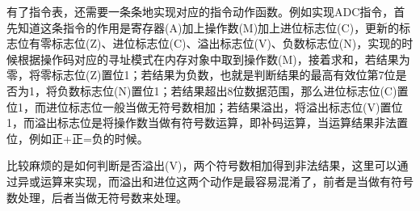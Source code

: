 \documentclass[a4paper]{ltxdoc}
\begin{document}
{%


有了指令表，还需要一条条地实现对应的指令动作函数。例如实现ADC指令，首先知道这条指令的作用是寄存器(A)加上操作数(M)加上进位标志位(C)\cite{6502instruction}，更新的标志位有零标志位(Z)、进位标志位(C)、溢出标志位(V)、负数标志位(N)，实现的时候根据操作码对应的寻址模式在内存对象中取到操作数(M)，接着求和，若结果为零，将零标志位(Z)置位1；若结果为负数，也就是判断结果的最高有效位第7位是否为1，将负数标志位(N)置位1；若结果超出8位数据范围，那么进位标志位(C)置位1，而进位标志位一般当做无符号数相加；若结果溢出，将溢出标志位(V)置位1，而溢出标志位是将操作数当做有符号数运算，即补码运算，当运算结果非法置位，例如正+正=负的时候。

比较麻烦的是如何判断是否溢出(V)，两个符号数相加得到非法结果，这里可以通过异或运算来实现，而溢出和进位这两个动作是最容易混淆了，前者是当做有符号数处理，后者当做无符号数来处理。\cite{overflow}

}
\end{document}
